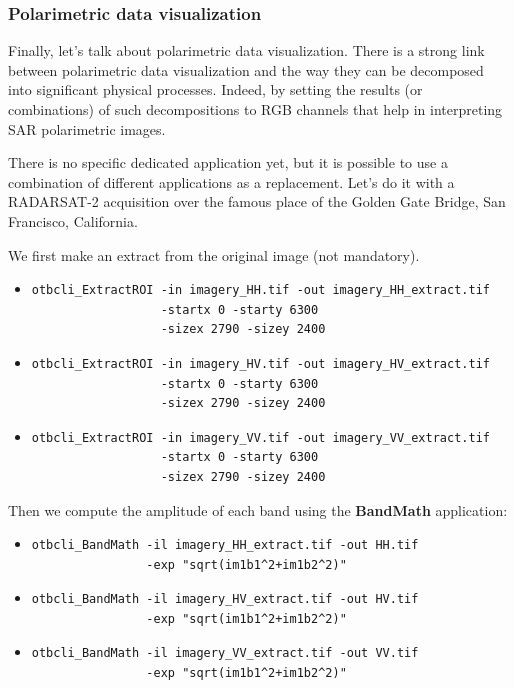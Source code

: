 \subsubsection{Polarimetric data visualization}

Finally, let's talk about polarimetric data visualization. There is a strong
link between polarimetric data visualization and the way they can be decomposed
into significant physical processes.  Indeed, by setting the results (or
combinations) of such decompositions to RGB channels that help in interpreting
SAR polarimetric images.

There is no specific dedicated application yet, but it is possible to use a
combination of different applications as a replacement.  Let's do it with a
RADARSAT-2 acquisition over the famous place of the Golden Gate Bridge, San
Francisco, California.

We first make an extract from the original image (not mandatory). 

\begin{itemize}
\item 
\begin{verbatim} 
otbcli_ExtractROI -in imagery_HH.tif -out imagery_HH_extract.tif 
                  -startx 0 -starty 6300 
                  -sizex 2790 -sizey 2400 
\end{verbatim}
									  
\item 
\begin{verbatim} 
otbcli_ExtractROI -in imagery_HV.tif -out imagery_HV_extract.tif 
                  -startx 0 -starty 6300 
                  -sizex 2790 -sizey 2400 
\end{verbatim}
									  
\item 
\begin{verbatim} 
otbcli_ExtractROI -in imagery_VV.tif -out imagery_VV_extract.tif 
                  -startx 0 -starty 6300 
                  -sizex 2790 -sizey 2400 
\end{verbatim}
\end{itemize}

Then we compute the amplitude of each band using the \textbf{BandMath}
application:

\begin{itemize}
\item 
\begin{verbatim} 
otbcli_BandMath -il imagery_HH_extract.tif -out HH.tif 
                -exp "sqrt(im1b1^2+im1b2^2)" 
\end{verbatim}
									  
\item 
\begin{verbatim} 
otbcli_BandMath -il imagery_HV_extract.tif -out HV.tif
                -exp "sqrt(im1b1^2+im1b2^2)" 
\end{verbatim}
									  
\item 
\begin{verbatim} 
otbcli_BandMath -il imagery_VV_extract.tif -out VV.tif
                -exp "sqrt(im1b1^2+im1b2^2)" 
\end{verbatim}
\end{itemize}

